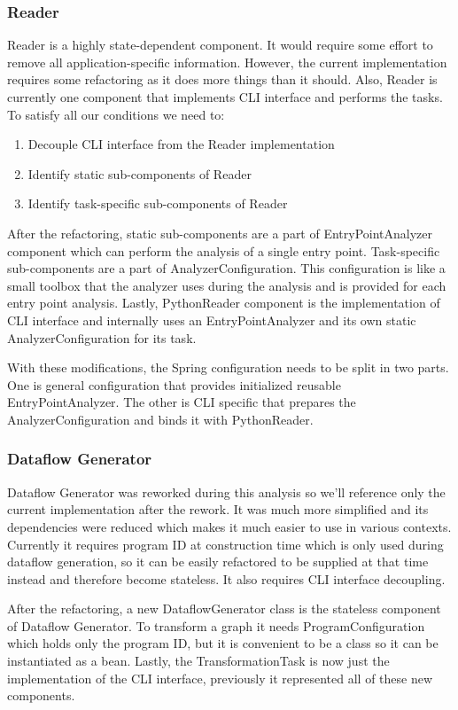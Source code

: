 \subsubsection{Reader}
Reader is a highly state-dependent component. It would require some effort to remove all application-specific information. However, the current implementation requires some refactoring as it does more things than it should. Also, Reader is currently one component that implements CLI interface and performs the tasks. To satisfy all our conditions we need to:
\begin{enumerate}
    \item Decouple CLI interface from the Reader implementation
    \item Identify static sub-components of Reader
    \item Identify task-specific sub-components of Reader
\end{enumerate}
After the refactoring, static sub-components are a part of EntryPointAnalyzer component which can perform the analysis of a single entry point. Task-specific sub-components are a part of AnalyzerConfiguration. This configuration is like a small toolbox that the analyzer uses during the analysis and is provided for each entry point analysis. Lastly, PythonReader component is the implementation of CLI interface and internally uses an EntryPointAnalyzer and its own static AnalyzerConfiguration for its task. 
\par
With these modifications, the Spring configuration needs to be split in two parts. One is general configuration that provides initialized reusable EntryPointAnalyzer. The other is CLI specific that prepares the AnalyzerConfiguration and binds it with PythonReader.

\subsubsection{Dataflow Generator}
Dataflow Generator was reworked during this analysis so we’ll reference only the current implementation after the rework. It was much more simplified and its dependencies were reduced which makes it much easier to use in various contexts. Currently it requires program ID at construction time which is only used during dataflow generation, so it can be easily refactored to be supplied at that time instead and therefore become stateless. It also requires CLI interface decoupling.
\par
After the refactoring, a new DataflowGenerator class is the stateless component of Dataflow Generator. To transform a graph it needs ProgramConfiguration which holds only the program ID, but it is convenient to be a class so it can be instantiated as a bean. Lastly, the TransformationTask is now just the implementation of the CLI interface, previously it represented all of these new components.

